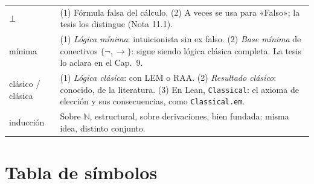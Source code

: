 \documentclass[11pt,a4paper]{article}
\begin{document}
{\begin{longtable}{@{}p{}p{}@{}}
\(\bot\) & (1) Fórmula falsa del cálculo. (2) A veces se usa para «Falso»; la tesis los distingue (Nota 11.1).\\
mínima & (1) \emph{Lógica mínima}: intuicionista sin ex falso. (2) \emph{Base mínima} de conectivos \(\{\neg,\to\}\): sigue siendo lógica clásica completa. La tesis lo aclara en el Cap.\ 9.\\
clásico / clásica & (1) \emph{Lógica clásica}: con LEM o RAA. (2) \emph{Resultado clásico}: conocido, de la literatura. (3) En Lean, \texttt{Classical}: el axioma de elección y sus consecuencias, como \texttt{Classical.em}.\\
inducción & Sobre \(\mathbb N\), estructural, sobre derivaciones, bien fundada: misma idea, distinto conjunto.\\
\bottomrule
\end{longtable}
}

\section{Tabla de símbolos}
\end{document}
